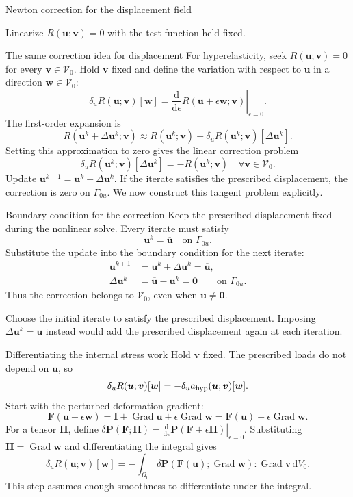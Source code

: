 \documentclass[11pt,aspectratio=169]{beamer}
\newcommand{\bu}{\bm u}
\newcommand{\bv}{\bm v}
\newcommand{\bw}{\bm w}
\newcommand{\bF}{\bm F}
\newcommand{\bP}{\bm P}
\newcommand{\bI}{\bm I}
\newcommand{\Grad}{\operatorname{Grad}}
\newcommand{\Vzero}{\mathcal V_0}
\begin{document}
\begin{frame}
\centering\vfill
{\LARGE Newton correction for the displacement field\par}
\vspace{0.5cm}
Linearize $R(\bu;\bv)=0$ with the test function held fixed.
\vfill
\end{frame}

\begin{frame}{The same correction idea for displacement}
For hyperelasticity, seek $R(\bu;\bv)=0$ for every $\bv\in\Vzero$.
Hold $\bv$ fixed and define the variation with respect to $\bu$
in a direction $\bw\in\Vzero$:
\[
\delta_uR(\bu;\bv)[\bw]
=\left.\frac{\mathrm d}{\mathrm d\epsilon}
R(\bu+\epsilon\bw;\bv)\right|_{\epsilon=0}.
\]
The first-order expansion is
\[
R(\bu^k+\Delta\bu^k;\bv)
\approx R(\bu^k;\bv)+\delta_uR(\bu^k;\bv)[\Delta\bu^k].
\]
Setting this approximation to zero gives the linear correction problem
\[
\boxed{\delta_uR(\bu^k;\bv)[\Delta\bu^k]
=-R(\bu^k;\bv)\quad\forall\bv\in\Vzero.}
\]
Update $\bu^{k+1}=\bu^k+\Delta\bu^k$.
If the iterate satisfies the prescribed displacement, the correction is zero
on $\Gamma_{0u}$. We now construct this tangent problem explicitly.
\end{frame}

\begin{frame}{Boundary condition for the correction}
Keep the prescribed displacement fixed during the nonlinear solve.
Every iterate must satisfy
\[
\bu^k=\overline{\bu}\quad\text{on }\Gamma_{0u}.
\]
Substitute the update into the boundary condition for the next iterate:
\[
\begin{aligned}
\bu^{k+1}&=\bu^k+\Delta\bu^k=\overline{\bu},\\
\Delta\bu^k&=\overline{\bu}-\bu^k=\bm0
\qquad\text{on }\Gamma_{0u}.
\end{aligned}
\]
Thus the correction belongs to $\Vzero$, even when
$\overline{\bu}\ne\bm0$.

Choose the initial iterate to satisfy the prescribed displacement.
Imposing $\Delta\bu^k=\overline{\bu}$ instead would add the prescribed
displacement again at each iteration.
\end{frame}

\begin{frame}{Differentiating the internal stress work}
Hold $\bv$ fixed. The prescribed loads do not depend on $\bu$, so
\[
\delta_uR(\bu;\bv)[\bw]=-\delta_ua_{\rm hyp}(\bu;\bv)[\bw].
\]
Start with the perturbed deformation gradient:
\[
\bF(\bu+\epsilon\bw)
=\bI+\Grad\bu+\epsilon\Grad\bw
=\bF(\bu)+\epsilon\Grad\bw.
\]
For a tensor $\bm H$, define
$\delta\bP(\bF;\bm H)=
\left.\frac{\mathrm d}{\mathrm d\epsilon}\bP(\bF+\epsilon\bm H)
\right|_{\epsilon=0}$.
Substituting $\bm H=\Grad\bw$ and differentiating the integral gives
\[
\boxed{\delta_uR(\bu;\bv)[\bw]
=-\int_{\Omega_0}\delta\bP(\bF(\bu);\Grad\bw):\Grad\bv\,\mathrm dV_0.}
\]
This step assumes enough smoothness to differentiate under the integral.
\end{frame}
\end{document}
